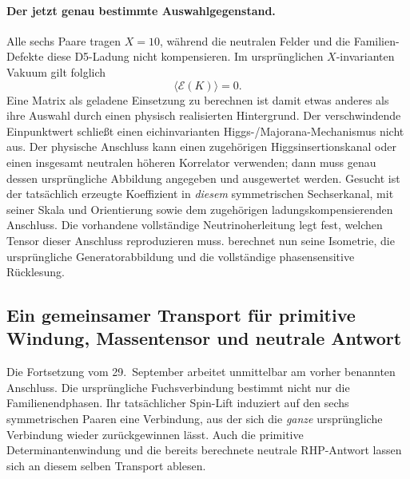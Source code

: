 \paragraph{Der jetzt genau bestimmte Auswahlgegenstand.}
Alle sechs Paare tragen $X=10$, während die neutralen Felder und die
Familien-Defekte diese D5-Ladung nicht kompensieren. Im ursprünglichen
$X$-invarianten Vakuum gilt folglich
\[
 \langle\mathcal E(K)\rangle=0.
\]
Eine Matrix als geladene Einsetzung zu berechnen ist damit etwas anderes
als ihre Auswahl durch einen physisch realisierten Hintergrund.
Der verschwindende Einpunktwert schließt einen eichinvarianten
Higgs-/Majorana-Mechanismus nicht aus. Der physische Anschluss kann einen
zugehörigen Higgsinsertionskanal oder einen insgesamt neutralen höheren
Korrelator verwenden; dann muss genau dessen ursprüngliche Abbildung
angegeben und ausgewertet werden.
Gesucht ist der tatsächlich erzeugte Koeffizient in \emph{diesem}
symmetrischen Sechserkanal, mit seiner Skala und Orientierung sowie dem
zugehörigen ladungskompensierenden Anschluss. Die vorhandene vollständige
Neutrinoherleitung legt fest, welchen Tensor dieser Anschluss reproduzieren muss.
 berechnet nun seine
Isometrie, die ursprüngliche Generatorabbildung und die vollständige
phasensensitive Rücklesung.


\subsection{Ein gemeinsamer Transport für primitive Windung, Massentensor und neutrale Antwort}\label{sec:masssourceconnection}
Die Fortsetzung vom 29.~September arbeitet unmittelbar am vorher benannten
Anschluss. Die ursprüngliche Fuchsverbindung bestimmt nicht nur die
Familienendphasen. Ihr tatsächlicher Spin-Lift induziert auf den sechs
symmetrischen Paaren eine Verbindung, aus der sich die \emph{ganze}
ursprüngliche Verbindung wieder zurückgewinnen lässt. Auch die primitive
Determinantenwindung und die bereits berechnete neutrale RHP-Antwort lassen
sich an diesem selben Transport ablesen.

